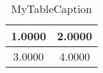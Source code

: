 \documentclass[a4paper,10pt]{article}
\begin{document}
\begin{table}
\centering
\begin{tabular}{cc}
\toprule
1.0000 & 2.0000 \\
\midrule
3.0000 & 4.0000 \\
\bottomrule
\end{tabular}
\caption{MyTableCaption}
\label{table:MyTableLabel}
\end{table}
\end{document}
